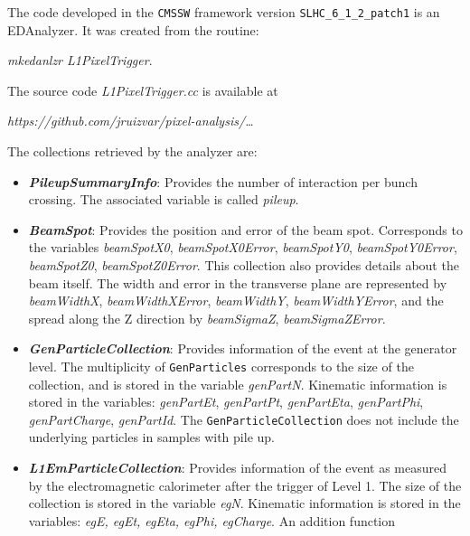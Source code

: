 \documentclass[a4paper,12pt,oneside]{article}
\begin{document}
                   The code developed in the \texttt{CMSSW} framework version \texttt{SLHC\_6\_1\_2\_patch1} is an EDAnalyzer. It was
                   created from the routine:

                   {\it mkedanlzr L1PixelTrigger}.

                   The source code {\it L1PixelTrigger.cc} is available at

                   {\it https://github.com/jruizvar/pixel-analysis/…}

                   The collections retrieved by the analyzer are:
                   \begin{itemize}
                   \item \textbf{\textit{PileupSummaryInfo}}: Provides the number of interaction per bunch crossing. The associated
                     variable is called {\it pileup}.
                   \item \textbf{\textit{BeamSpot}}: Provides the position and error of the beam spot. Corresponds to the variables
                     {\it beamSpotX0}, {\it beamSpotX0Error}, {\it beamSpotY0}, {\it beamSpotY0Error}, {\it beamSpotZ0},
                     {\it beamSpotZ0Error}. This collection also provides details about the beam itself. The width and error in the
                     transverse plane are represented by {\it beamWidthX}, {\it beamWidthXError}, {\it beamWidthY},
                     {\it beamWidthYError}, and the spread along the Z direction by {\it beamSigmaZ}, {\it beamSigmaZError}.
                   \item \textbf{\textit{GenParticleCollection}}: Provides information of the event at the generator level. The
                     multiplicity of \texttt{GenParticles} corresponds to the size of the collection, and is stored in the variable
                     {\it genPartN}. Kinematic information is stored in the variables: {\it genPartEt}, {\it genPartPt},
                     {\it genPartEta}, {\it genPartPhi}, {\it genPartCharge}, {\it genPartId}. The \texttt{GenParticleCollection}
                     does not include the underlying particles in samples with pile up. 
                   \item \textbf{\textit{L1EmParticleCollection}}: Provides information of the event as measured by the electromagnetic
                     calorimeter after the trigger of Level 1. The size of the collection is stored in the variable {\it egN}.
                     Kinematic information is stored in the variables: {\it egE, egEt, egEta, egPhi, egCharge}. An addition function

\end{itemize}
\end{document}
